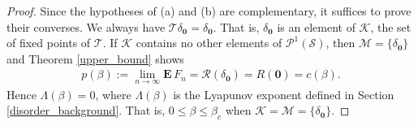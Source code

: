 \documentclass[11pt,reqno]{amsart}
\numberwithin{equation}{section}
\theoremstyle{definition}
\begin{document}
\begin{proof}
Since the hypotheses of (a) and (b) are complementary, it suffices to prove their converses.
We always have ${\mathcal{T}}\delta_{{{\boldsymbol {0}}}} = \delta_{{{\boldsymbol {0}}}}$.
That is, $\delta_{{{\boldsymbol {0}}}}$ is an element of ${\mathcal{K}}$, the set of fixed points of ${\mathcal{T}}$.
If ${\mathcal{K}}$ contains no other elements of ${\mathcal{P}}^1({\mathcal{S}})$, then ${\mathcal{M}} = \{\delta_{{{\boldsymbol {0}}}}\}$ and Theorem \ref{upper_bound} shows
{\begin{align*} {
p(\beta) := \lim_{n \to \infty} {\mathbf{E}}\, F_n = {\mathcal{R}}(\delta_{{\boldsymbol {0}}}) = R({{\boldsymbol {0}}}) = c(\beta).
} \end{align*}}
Hence $\Lambda(\beta) = 0$, where $\Lambda(\beta)$ is the Lyapunov exponent defined in Section \ref{disorder_background}.
That is, $0 \leq \beta \leq \beta_c$ when ${\mathcal{K}} = {\mathcal{M}} = \{\delta_{{{\boldsymbol {0}}}}\}$.


\end{proof}
\end{document}
